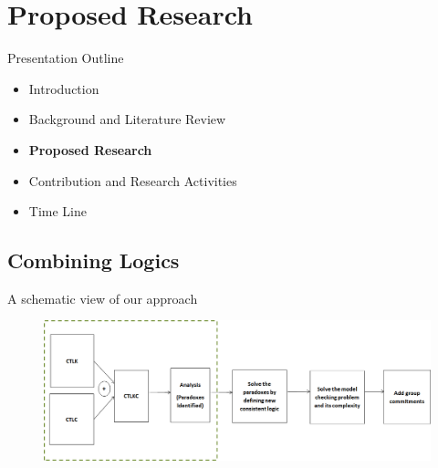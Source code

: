 \documentclass{beamer}
\begin{document}
\section{Proposed Research}
\begin{frame}{Presentation Outline}
    \begin{itemize}
     	\itemsep=.5cm
    	\item Introduction
    	\item Background and Literature Review
    	\item {\bf Proposed Research}
        \item Contribution and Research Activities
    	\item Time Line
    \end{itemize}
\end{frame}

\subsection{Combining Logics}

\begin{frame}{A schematic view of our approach}

\begin{figure}[htbp]
\centering
\includegraphics[width=1.05 \columnwidth]{figures/figure9.png}
\end{figure}

\end{frame}
\end{document}
